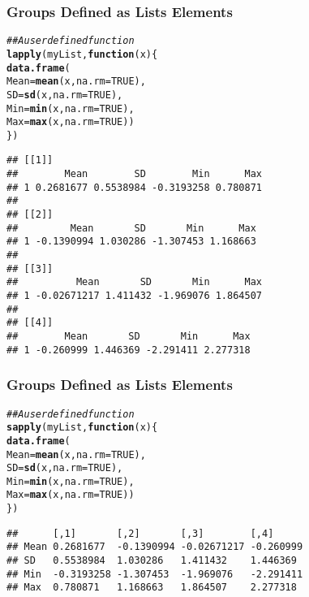 \documentclass[paper=screen,mathserif]{beamer}\usepackage[]{graphicx}\usepackage[]{color}
\makeatletter
\newcommand{\hlnum}[1]{\textcolor[rgb]{0.686,0.059,0.569}{#1}}%
\newcommand{\hlcom}[1]{\textcolor[rgb]{0.678,0.584,0.686}{\textit{#1}}}%
\newcommand{\hlstd}[1]{\textcolor[rgb]{0.345,0.345,0.345}{#1}}%
\newcommand{\hlkwa}[1]{\textcolor[rgb]{0.161,0.373,0.58}{\textbf{#1}}}%
\newcommand{\hlkwc}[1]{\textcolor[rgb]{0.333,0.667,0.333}{#1}}%
\newcommand{\hlkwd}[1]{\textcolor[rgb]{0.737,0.353,0.396}{\textbf{#1}}}%
\newenvironment{kframe}{%
 \def\at@end@of@kframe{}%
 \ifinner\ifhmode%
  \def\at@end@of@kframe{\end{minipage}}%
  \begin{minipage}{\columnwidth}%
 \fi\fi%
 \def\FrameCommand##1{\hskip\@totalleftmargin \hskip-\fboxsep
 \colorbox{shadecolor}{##1}\hskip-\fboxsep
     \hskip-\linewidth \hskip-\@totalleftmargin \hskip\columnwidth}%
 \MakeFramed {\advance\hsize-\width
   \@totalleftmargin\z@ \linewidth\hsize
   \@setminipage}}%
 {\par\unskip\endMakeFramed%
 \at@end@of@kframe}
\newenvironment{knitrout}{}{} %
\newcommand{\ft}[1]{\frametitle{#1}}
\makeatother
\begin{document}
\begin{frame}[fragile]
  \ft{Groups Defined as Lists Elements}

\begin{knitrout}\scriptsize
{}\color{fgcolor}\begin{kframe}
\begin{alltt}
\hlcom{## A user defined function}
\hlkwd{lapply}\hlstd{(myList,} \hlkwa{function}\hlstd{(}\hlkwc{x}\hlstd{) \{}
    \hlkwd{data.frame}\hlstd{(}
        \hlkwc{Mean} \hlstd{=} \hlkwd{mean}\hlstd{(x,} \hlkwc{na.rm} \hlstd{=} \hlnum{TRUE}\hlstd{),}
        \hlkwc{SD} \hlstd{=} \hlkwd{sd}\hlstd{(x,} \hlkwc{na.rm} \hlstd{=} \hlnum{TRUE}\hlstd{),}
        \hlkwc{Min} \hlstd{=} \hlkwd{min}\hlstd{(x,} \hlkwc{na.rm} \hlstd{=} \hlnum{TRUE}\hlstd{),}
        \hlkwc{Max} \hlstd{=} \hlkwd{max}\hlstd{(x,} \hlkwc{na.rm} \hlstd{=} \hlnum{TRUE}\hlstd{))}
\hlstd{\})}
\end{alltt}
\begin{verbatim}
## [[1]]
##        Mean        SD        Min      Max
## 1 0.2681677 0.5538984 -0.3193258 0.780871
## 
## [[2]]
##         Mean       SD       Min      Max
## 1 -0.1390994 1.030286 -1.307453 1.168663
## 
## [[3]]
##          Mean       SD       Min      Max
## 1 -0.02671217 1.411432 -1.969076 1.864507
## 
## [[4]]
##        Mean       SD       Min      Max
## 1 -0.260999 1.446369 -2.291411 2.277318
\end{verbatim}
\end{kframe}
\end{knitrout}

\end{frame}

\begin{frame}[fragile]
  \ft{Groups Defined as Lists Elements}

\begin{knitrout}\scriptsize
{}\color{fgcolor}\begin{kframe}
\begin{alltt}
\hlcom{## A user defined function}
\hlkwd{sapply}\hlstd{(myList,} \hlkwa{function}\hlstd{(}\hlkwc{x}\hlstd{) \{}
    \hlkwd{data.frame}\hlstd{(}
        \hlkwc{Mean} \hlstd{=} \hlkwd{mean}\hlstd{(x,} \hlkwc{na.rm} \hlstd{=} \hlnum{TRUE}\hlstd{),}
        \hlkwc{SD} \hlstd{=} \hlkwd{sd}\hlstd{(x,} \hlkwc{na.rm} \hlstd{=} \hlnum{TRUE}\hlstd{),}
        \hlkwc{Min} \hlstd{=} \hlkwd{min}\hlstd{(x,} \hlkwc{na.rm} \hlstd{=} \hlnum{TRUE}\hlstd{),}
        \hlkwc{Max} \hlstd{=} \hlkwd{max}\hlstd{(x,} \hlkwc{na.rm} \hlstd{=} \hlnum{TRUE}\hlstd{))}
\hlstd{\})}
\end{alltt}
\begin{verbatim}
##      [,1]       [,2]       [,3]        [,4]     
## Mean 0.2681677  -0.1390994 -0.02671217 -0.260999
## SD   0.5538984  1.030286   1.411432    1.446369 
## Min  -0.3193258 -1.307453  -1.969076   -2.291411
## Max  0.780871   1.168663   1.864507    2.277318
\end{verbatim}
\end{kframe}
\end{knitrout}

\end{frame}
\end{document}
